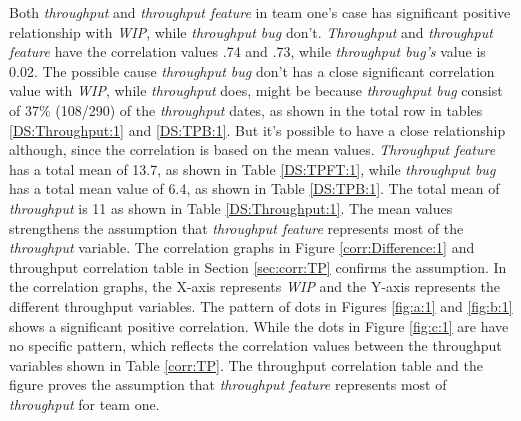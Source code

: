 \documentclass[UKenglish]{ifimaster}  %
\begin{document}
Both \textit{throughput} and \textit{throughput feature} in team one's case has significant positive relationship with \textit{WIP}, while \textit{throughput bug} don't. \textit{Throughput} and \textit{throughput feature} have the correlation values .74 and .73, while \textit{throughput bug's} value is 0.02. The possible cause \textit{throughput bug} don't has a close significant correlation value with \textit{WIP}, while \textit{throughput} does, might be because \textit{throughput bug} consist of 37\% (108/290) of the \textit{throughput} dates, as shown in the total row in tables \ref{DS:Throughput:1} and \ref{DS:TPB:1}. But it's possible to have a close relationship although, since the correlation is based on the mean values. \textit{Throughput feature} has a total mean of 13.7, as shown in Table  \ref{DS:TPFT:1}, while \textit{throughput  bug} has a total mean value of 6.4, as shown in Table \ref{DS:TPB:1}. The total mean of \textit{throughput} is 11 as shown in Table \ref{DS:Throughput:1}. The mean values strengthens the assumption that \textit{throughput feature} represents most of the \textit{throughput} variable. The correlation  graphs in Figure \ref{corr:Difference:1}  and throughput correlation table in Section \ref{sec:corr:TP} confirms the assumption. In the correlation graphs, the X-axis represents \textit{WIP} and the Y-axis represents the different throughput variables. The pattern of dots in Figures \ref{fig:a:1} and \ref{fig:b:1} shows a significant positive correlation. While the dots in Figure \ref{fig:c:1} are have no specific pattern, which reflects the correlation values between the throughput variables shown in Table \ref{corr:TP}. The throughput correlation table and the figure proves the assumption that  \textit{throughput feature} represents most of \textit{throughput} for team one.
\end{document}
